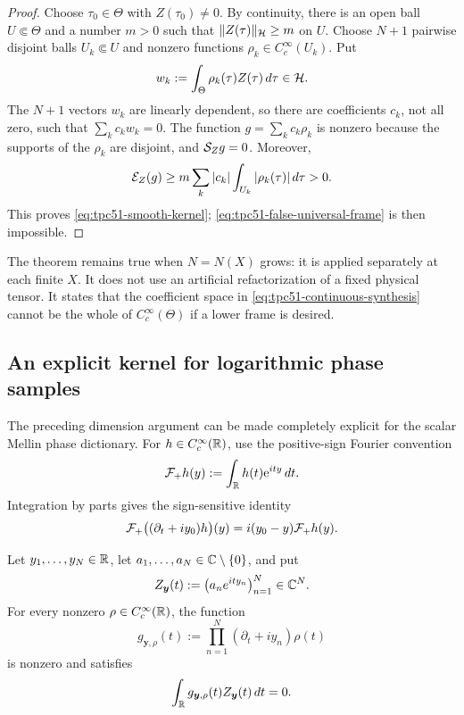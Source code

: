 \begin{proof}
Choose \(\tau_0\in\Theta\) with \(Z(\tau_0)\ne0\).  By continuity,
there is an open ball \(U\Subset\Theta\) and a number \(m>0\) such that
\(\|Z(\tau)\|_\mathcal H\ge m\) on \(U\).  Choose \(N+1\) pairwise disjoint
balls \(U_k\Subset U\) and nonzero functions
\(\rho_k\in C_c^\infty(U_k)\).  Put
\[
 w_k:=\int_\Theta \rho_k(\tau)Z(\tau)\,d\tau\in\mathcal H.
\]
The \(N+1\) vectors \(w_k\) are linearly dependent, so there are
coefficients \(c_k\), not all zero, such that
\(\sum_kc_kw_k=0\).  The function
\(g=\sum_kc_k\rho_k\) is nonzero because the supports of the
\(\rho_k\) are disjoint, and \(\mathcal S_Zg=0\).  Moreover,
\[
 \mathcal E_Z(g)
 \ge m\sum_k |c_k|\int_{U_k}|\rho_k(\tau)|\,d\tau>0.
\]
This proves \eqref{eq:tpc51-smooth-kernel};
\eqref{eq:tpc51-false-universal-frame} is then impossible.
\end{proof}

The theorem remains true when \(N=N(X)\) grows: it is applied
separately at each finite \(X\).  It does not use an artificial
refactorization of a fixed physical tensor.  It states that the
coefficient space in \eqref{eq:tpc51-continuous-synthesis} cannot be
the whole of \(C_c^\infty(\Theta)\) if a lower frame is desired.

\subsection{An explicit kernel for logarithmic phase samples}

The preceding dimension argument can be made completely explicit for
the scalar Mellin phase dictionary.  For \(h\in C_c^\infty(\mathbb R)\), use
the positive-sign Fourier convention
\begin{equation}
 \mathcal F_+h(y):=\int_\mathbb R h(t)\mathrm e^{ity}\,dt.
 \label{eq:tpc51-positive-Fourier}
\end{equation}
Integration by parts gives the sign-sensitive identity
\begin{equation}
 \mathcal F_+\bigl((\partial_t+iy_0)h\bigr)(y)
 =i(y_0-y)\mathcal F_+h(y).
 \label{eq:tpc51-ibp-sign}
\end{equation}

\begin{proposition}
\label{prop:tpc51-explicit-phase-kernel}
Let \(y_1,\ldots,y_N\in\mathbb R\), let
\(a_1,\ldots,a_N\in\mathbb C\setminus\{0\}\),
and put
\begin{equation}
 Z_{\bm y}(t)
 :=\bigl(a_ne^{ity_n}\bigr)_{n=1}^N\in\mathbb C^N.
 \label{eq:tpc51-phase-dictionary}
\end{equation}
For every nonzero \(\rho\in C_c^\infty(\mathbb R)\), the function
\begin{equation}
 g_{\bm y,\rho}(t)
 :=\prod_{n=1}^N(\partial_t+iy_n)\rho(t)
 \label{eq:tpc51-explicit-phase-kernel-function}
\end{equation}
is nonzero and satisfies
\begin{equation}
 \int_\mathbb R g_{\bm y,\rho}(t)Z_{\bm y}(t)\,dt=0.
 \label{eq:tpc51-explicit-phase-kernel-output}
\end{equation}
\end{proposition}

